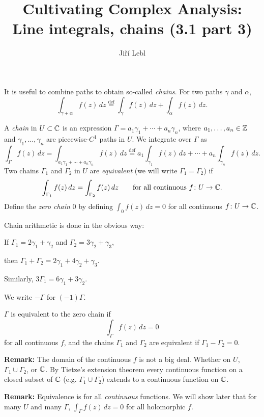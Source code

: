\documentclass[10pt,aspectratio=169]{beamer}
\author{Ji\v{r}\'i Lebl}
\institute[OSU]{%
Departemento pri Matematiko de Oklahoma {\^S}tata Universitato}
\title{Cultivating Complex Analysis:\\%
Line integrals, chains (3.1 part 3)}
\date{}
\begin{document}
\begin{frame}
\titlepage
\end{frame}

\begin{frame}
It is useful to combine paths to obtain so-called \emph{chains}.
\pause
For two paths $\gamma$ and $\alpha$,
\[
\int_{\gamma + \alpha} f(z) \, dz
\overset{\text{def}}{=}
\int_{\gamma} f(z) \, dz +
\int_{\alpha} f(z) \, dz .
\]

\pause

\begin{definition}
A \emph{chain} in $U \subset {\mathbb{C}}$ is an expression
$\Gamma = a_1 \gamma_1 + \cdots + a_n \gamma_n$,
where $a_1,\ldots,a_n \in {\mathbb{Z}}$ and $\gamma_1,\ldots,\gamma_n$
are piecewise-$C^1$ paths in $U$. \pause  We integrate over $\Gamma$ as
\[
\int_{\Gamma} f(z) \, dz
=
\int_{a_1 \gamma_1 + \cdots + a_n \gamma_n} f(z) \, dz
\overset{\text{def}}{=}
a_1 \int_{\gamma_1} f(z) \, dz +
\cdots
+
a_n \int_{\gamma_n} f(z) \, dz .
\]
\pause
Two chains $\Gamma_1$ and $\Gamma_2$ in 
$U$ are
\emph{equivalent} (we will write
$\Gamma_1=\Gamma_2$) if
\[
\int_{\Gamma_1} f(z) \, dz = 
\int_{\Gamma_2} f(z) \, dz
\qquad
\text{for all continuous } f \colon U \to {\mathbb{C}}.
\]
\pause
Define the \emph{zero chain} $0$ by defining 
$\int_0 f(z) \, dz = 0$ for all continuous $f \colon U \to {\mathbb{C}}$.
\end{definition}
\end{frame}

\begin{frame}
Chain arithmetic is done in the obvious way:

\medskip
\pause

If $\Gamma_1 = 2 \gamma_1 + \gamma_2$ and $\Gamma_2 = 3 \gamma_2 +
\gamma_3$,

then $\Gamma_1 + \Gamma_2 = 2 \gamma_1 + 4 \gamma_2 + \gamma_3$.

\medskip
\pause

Similarly, $3 \Gamma_1 = 6 \gamma_1 + 3 \gamma_2$.

\medskip
\pause

We write $-\Gamma$ for $(-1)\Gamma$.

\medskip
\pause

$\Gamma$ is equivalent to the zero chain if
\begin{equation*}
\int_\Gamma f(z)\, dz = 0
\end{equation*}
for all continuous $f$, and
the chains $\Gamma_1$ and $\Gamma_2$ are equivalent if $\Gamma_1 - \Gamma_2 = 0$.

\medskip
\pause

\textbf{Remark:}
The domain of the continuous $f$ is not a big deal.  Whether on
$U$, $\Gamma_1 \cup \Gamma_2$, or ${\mathbb{C}}$.
By Tietze's extension theorem
every continuous function on a closed subset of ${\mathbb{C}}$ (e.g. $\Gamma_1 \cup
\Gamma_2$) extends to a
continuous function on ${\mathbb{C}}$.

\medskip
\pause

\textbf{Remark:}
Equivalence is for all \emph{continuous} functions.
We will show later that for many $U$ and many $\Gamma$,
$\int_\Gamma f(z) \, dz = 0$ for all holomorphic $f$.
\end{frame}
\end{document}
